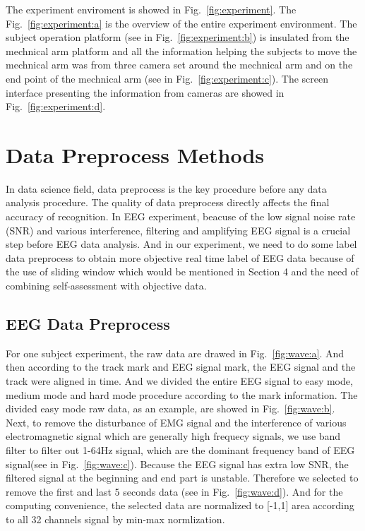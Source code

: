 \documentclass[runningheads,a4paper]{llncs}
\begin{document}
The experiment enviroment is showed in Fig.~\ref{fig:experiment}.
The Fig.~\ref{fig:experiment:a} is the overview of the entire experiment environment.
The subject operation platform (see in Fig.~\ref{fig:experiment:b}) is insulated
from the mechnical arm platform and
all the information helping the subjects to move the mechnical arm was from three
camera set around the mechnical arm and on the end point of the mechnical arm
(see in Fig.~\ref{fig:experiment:c}). The screen interface presenting the information from
cameras are showed in Fig.~\ref{fig:experiment:d}.

\section{Data Preprocess Methods}
In data science field, data preprocess is the key procedure before any data analysis
procedure. The quality of data preprocess directly affects the final accuracy of
recognition. In EEG experiment, beacuse of the low signal noise rate (SNR) and
various interference, filtering and amplifying EEG signal is a crucial step before
EEG data analysis. And in our experiment, we need to do some label data preprocess
to obtain more objective real time label of EEG data because of the use of sliding window which would
be mentioned in Section 4 and the need of combining self-assessment with objective data.

\subsection{EEG Data Preprocess}
For one subject experiment, the raw data are drawed in Fig.~\ref{fig:wave:a}.
And then according to the track mark and EEG signal mark, the EEG signal and
the track were aligned in time. And we divided the entire EEG signal to
easy mode, medium mode and hard mode procedure according to the mark information.
The divided easy mode raw data, as an example, are showed in Fig.~\ref{fig:wave:b}.
Next, to remove the disturbance of EMG signal and the interference of various
electromagnetic signal which are generally high frequecy signals, we use band
filter to filter out 1-64Hz signal, which are the dominant frequency band of EEG
signal(see in Fig.~\ref{fig:wave:c}). Because the EEG signal has extra low SNR,
the filtered signal at the beginning and end part is unstable. Therefore we selected
to remove the first and last 5 seconds data (see in Fig.~\ref{fig:wave:d}).
And for the computing convenience, the selected data are normalized to [-1,1] area
according to all 32 channels signal by min-max normlization.
\end{document}

